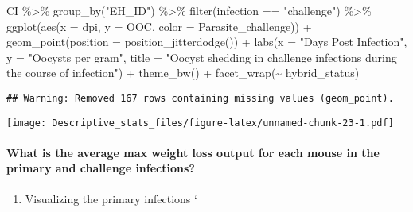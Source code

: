 \documentclass[
]{article}
\newenvironment{Shaded}{\begin{snugshade}}{\end{snugshade}}
\newcommand{\AttributeTok}[1]{\textcolor[rgb]{0.77,0.63,0.00}{#1}}
\newcommand{\FunctionTok}[1]{\textcolor[rgb]{0.00,0.00,0.00}{#1}}
\newcommand{\NormalTok}[1]{#1}
\newcommand{\SpecialCharTok}[1]{\textcolor[rgb]{0.00,0.00,0.00}{#1}}
\newcommand{\StringTok}[1]{\textcolor[rgb]{0.31,0.60,0.02}{#1}}
\providecommand{\tightlist}{%
  \setlength{\itemsep}{0pt}\setlength{\parskip}{0pt}}
\begin{document}
\begin{Shaded}
\begin{Highlighting}[]
\NormalTok{CI }\SpecialCharTok{\%\textgreater{}\%}
  \FunctionTok{group\_by}\NormalTok{(}\StringTok{"EH\_ID"}\NormalTok{) }\SpecialCharTok{\%\textgreater{}\%}
  \FunctionTok{filter}\NormalTok{(infection }\SpecialCharTok{==} \StringTok{"challenge"}\NormalTok{) }\SpecialCharTok{\%\textgreater{}\%}
  \FunctionTok{ggplot}\NormalTok{(}\FunctionTok{aes}\NormalTok{(}\AttributeTok{x =}\NormalTok{ dpi, }\AttributeTok{y =}\NormalTok{ OOC, }\AttributeTok{color =}\NormalTok{ Parasite\_challenge)) }\SpecialCharTok{+}
  \FunctionTok{geom\_point}\NormalTok{(}\AttributeTok{position =} \FunctionTok{position\_jitterdodge}\NormalTok{()) }\SpecialCharTok{+}
  \FunctionTok{labs}\NormalTok{(}\AttributeTok{x =} \StringTok{"Days Post Infection"}\NormalTok{, }\AttributeTok{y =} \StringTok{"Oocysts per gram"}\NormalTok{,}
       \AttributeTok{title =} \StringTok{"Oocyst shedding in challenge infections during the }
\StringTok{       course of infection"}\NormalTok{) }\SpecialCharTok{+}
    \FunctionTok{theme\_bw}\NormalTok{() }\SpecialCharTok{+}
    \FunctionTok{facet\_wrap}\NormalTok{(}\SpecialCharTok{\textasciitilde{}}\NormalTok{ hybrid\_status)}
\end{Highlighting}
\end{Shaded}

\begin{verbatim}
## Warning: Removed 167 rows containing missing values (geom_point).
\end{verbatim}

\texttt{[image: Descriptive\_stats\_files/figure-latex/unnamed-chunk-23-1.pdf]}

\hypertarget{what-is-the-average-max-weight-loss-output-for-each-mouse-in-the-primary-and-challenge-infections}{%
\paragraph{What is the average max weight loss output for each mouse in
the primary and challenge
infections?}\label{what-is-the-average-max-weight-loss-output-for-each-mouse-in-the-primary-and-challenge-infections}}

\begin{enumerate}
\def\labelenumi{\arabic{enumi}.}
\tightlist
\item
  Visualizing the primary infections `
\end{enumerate}
\end{document}
